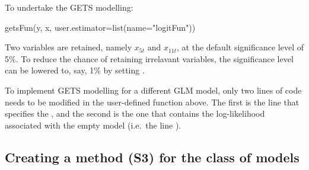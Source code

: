 %
To undertake the GETS modelling:
%
\begin{example}
  getsFun(y, x, user.estimator=list(name="logitFun"))
\end{example}
%
Two variables are retained, namely $x_{5t}$ and $x_{11t}$, at the default significance level of 5\%. To reduce the chance of retaining irrelavant variables, the significance level can be lowered to, say, 1\% by setting .

To implement GETS modelling for a different GLM model, only two lines of code needs to be modified in the user-defined function above. The first is the line that specifies the , and the second is the one that contains the log-likelihood associated with the empty model (i.e.\ the line ).

\subsection{Creating a  method (S3) for the  class of models}


